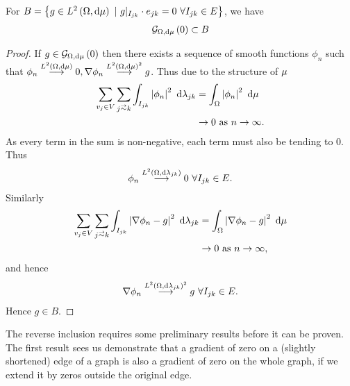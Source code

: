 \begin{prop} \label{prop:Grad0IncB}
	For $B = \clbracs{g\in\ltwo{\ddom}{\ddmes} \ \vert \ g\vert_{I_{jk}}\cdot e_{jk}=0 \ \forall I_{jk}\in E}$, we have
	\begin{align*}
		\mathcal{G}_{ \Omega, \mathrm{d}\mu}\left( 0 \right) \subset B
	\end{align*}
\end{prop}
\begin{proof}
	If $g\in\mathcal{G}_{ \Omega, \mathrm{d}\mu}\left( 0 \right)$ then there exists a sequence of smooth functions $\phi_n$ such that $\phi_n\overset{L^{2}\left( \Omega,\mathrm{d}\mu \right)}{\longrightarrow}0, \nabla\phi_n\overset{L^{2}\left( \Omega,\mathrm{d}\mu \right)^2}{\longrightarrow}g$.
	Thus due to the structure of $\mu$
	\begin{align*}
		\sum_{v_j\in V}\sum_{j\conLeft k}\integral{I_{jk}}{\abs{\phi_n}^2}{\lambda_{jk}} &= \integral{\ddom}{\abs{\phi_n}^2}{\ddmes} \\
		&\rightarrow 0 \toInfty{n}.
	\end{align*}
	As every term in the sum is non-negative, each term must also be tending to 0.
	Thus 
	\begin{align*}
		\phi_n\overset{L^{2}\left( \Omega,\mathrm{d}\lambda_{jk} \right)}{\longrightarrow}0 \ \forall I_{jk}\in E.
	\end{align*}
	Similarly
	\begin{align*}
		\sum_{v_j\in V}\sum_{j\conLeft k}\integral{I_{jk}}{\abs{\grad\phi_n - g}^2}{\lambda_{jk}} &= \integral{\ddom}{\abs{\grad\phi_n - g}^2}{\ddmes} \\
		&\rightarrow 0 \toInfty{n},
	\end{align*}	
	and hence 
	\begin{align*}
		\nabla\phi_n\overset{L^{2}\left( \Omega,\mathrm{d}\lambda_{jk} \right)^2}{\longrightarrow} g \ \forall I_{jk}\in E.
	\end{align*}
	Hence $g\in B$.
\end{proof}

The reverse inclusion requires some preliminary results before it can be proven.
The first result sees us demonstrate that a gradient of zero on a (slightly shortened) edge of a graph is also a gradient of zero on the whole graph, if we extend it by zeros outside the original edge.

